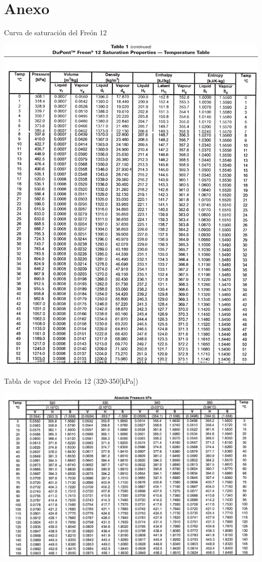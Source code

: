 \documentclass[11pt,letterpaper]{extarticle}        %
\numberwithin{equation}{section}                    %
\begin{document}
\section{Anexo}
\setcounter{section}{1}
\renewcommand*\thesection{\Alph{section}}
\begin{table}[H]
\centering
\caption[Curva de saturación del Freón 12]{Curva de saturación del Freón 12\cite{b:Tabla}}
\label{t:Freon12Saturacion}
\includegraphics[width=0.9\linewidth]{TablaFreon12}
\end{table}

\begin{table}[H]
\centering
\caption[Tabla de vapor del Freón 12 (320-350{[}kPa{]})]{Tabla de vapor del Freón 12 (320-350{[}kPa{]})\cite{b:Tabla}}
\label{t:Freon12-340}
\includegraphics[width=0.85\linewidth]{TV-R12-340}
\end{table}
\end{document}
